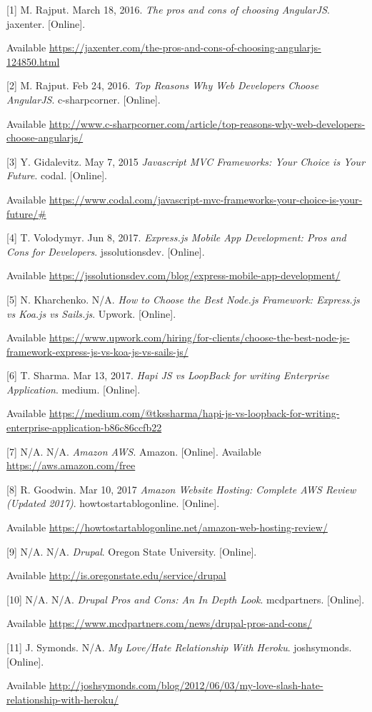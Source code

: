 \documentclass[onecolumn, draftclsnofoot,10pt, compsoc]{IEEEtran}
\begin{document}
[1] M. Rajput. March 18, 2016. \textit{The pros and cons of choosing AngularJS}. jaxenter. [Online]. 

Available \url{https://jaxenter.com/the-pros-and-cons-of-choosing-angularjs-124850.html}

[2] M. Rajput. Feb 24, 2016. \textit{Top Reasons Why Web Developers Choose AngularJS}. c-sharpcorner. [Online]. 

Available \url{http://www.c-sharpcorner.com/article/top-reasons-why-web-developers-choose-angularjs/}

[3] Y. Gidalevitz. May 7, 2015 \textit{Javascript MVC Frameworks: Your Choice is Your Future}. codal. [Online].  

Available \url{https://www.codal.com/javascript-mvc-frameworks-your-choice-is-your-future/#}

[4] T. Volodymyr. Jun 8, 2017. \textit{Express.js Mobile App Development: Pros and Cons for Developers}. jssolutionsdev. [Online].  

Available \url{https://jssolutionsdev.com/blog/express-mobile-app-development/}

[5] N. Kharchenko. N/A. \textit{How to Choose the Best Node.js Framework: Express.js vs Koa.js vs Sails.js}. Upwork. [Online]. 

Available \url{https://www.upwork.com/hiring/for-clients/choose-the-best-node-js-framework-express-js-vs-koa-js-vs-sails-js/}

[6] T. Sharma. Mar 13, 2017. \textit{Hapi JS vs LoopBack for writing Enterprise Application}. medium. [Online]. 

Available \url{https://medium.com/@tkssharma/hapi-js-vs-loopback-for-writing-enterprise-application-b86c86ccfb22}

[7] N/A. N/A. \textit{Amazon AWS}. Amazon. [Online]. Available \url{https://aws.amazon.com/free}

[8] R. Goodwin. Mar 10, 2017 \textit{Amazon Website Hosting: Complete AWS Review (Updated 2017)}. howtostartablogonline. [Online]. 

Available \url{https://howtostartablogonline.net/amazon-web-hosting-review/}

[9] N/A. N/A. \textit{ Drupal}. Oregon State University. [Online]. 

Available \url{http://is.oregonstate.edu/service/drupal}

[10] N/A. N/A. \textit{Drupal Pros and Cons: An In Depth Look}. mcdpartners. [Online]. 

Available \url{https://www.mcdpartners.com/news/drupal-pros-and-cons/}

[11] J. Symonds. N/A. \textit{My Love/Hate Relationship With Heroku}. joshsymonds. [Online]. 

Available \url{http://joshsymonds.com/blog/2012/06/03/my-love-slash-hate-relationship-with-heroku/}
\end{document}
